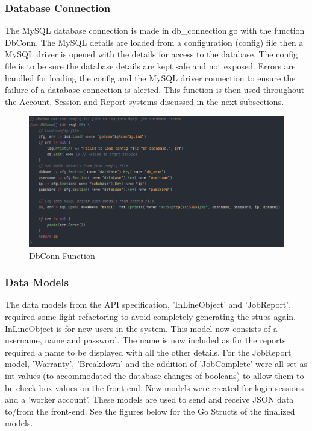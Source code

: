 \subsubsection{Database Connection}
The MySQL database connection is made in db\_connection.go with the function DbConn. The MySQL details are loaded from a configuration (config) file then a MySQL driver is opened with the details for access to the database. The config file is to be sure the database details are kept safe and not exposed. Errors are handled for loading the config and the MySQL driver connection to ensure the failure of a database connection is alerted. This function is then used throughout the Account, Session and Report systems discussed in the next subsections.

\begin{figure}[H]
    \caption{DbConn Function}
    \label{image:DbConn}
    \centering
    \includegraphics[width=1.0\textwidth]{images/horton/db_conn.png}
\end{figure}
 \newpage
\subsubsection{Data Models}
The data models from the API specification, 'InLineObject' and 'JobReport', required some light refactoring to avoid completely generating the stubs again. InLineObject is for new users in the system. This model now consists of a username, name and password. The name is now included as for the reports required a name to be displayed with all the other details. For the JobReport model, 'Warranty', 'Breakdown' and the addition of 'JobComplete' were all set as int values (to accommodated the database changes of booleans) to allow them to be check-box values on the front-end. New models were created for login sessions and a 'worker account'. These models are used to send and receive JSON data to/from the front-end. See the figures below for the Go Structs of the finalized models. 

